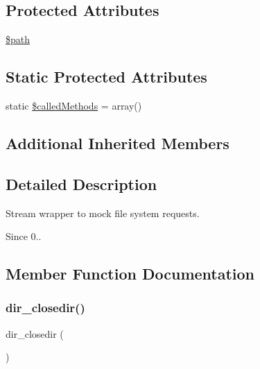 \subsection*{Protected Attributes}
\begin{DoxyCompactItemize}
\item 
\mbox{\hyperlink{classorg_1_1bovigo_1_1vfs_1_1vfs_stream_wrapper_recording_proxy_a0a4baf0b22973c07685c3981f0d17fc4}{\$path}}
\end{DoxyCompactItemize}
\subsection*{Static Protected Attributes}
\begin{DoxyCompactItemize}
\item 
static \mbox{\hyperlink{classorg_1_1bovigo_1_1vfs_1_1vfs_stream_wrapper_recording_proxy_a7e2763ef7e6bc69d801d17c2dd2a9e90}{\$called\+Methods}} = array()
\end{DoxyCompactItemize}
\subsection*{Additional Inherited Members}


\subsection{Detailed Description}
Stream wrapper to mock file system requests.

\begin{DoxySince}{Since}
0.. 
\end{DoxySince}


\subsection{Member Function Documentation}
\mbox{\label{classorg_1_1bovigo_1_1vfs_1_1vfs_stream_wrapper_recording_proxy_a9f2a581f636224b826e531c63953a907}} 
\subsubsection{\texorpdfstring{dir\+\_\+closedir()}{dir\_closedir()}}
{\footnotesize\ttfamily dir\+\_\+closedir (\begin{DoxyParamCaption}{ }\end{DoxyParamCaption})}

